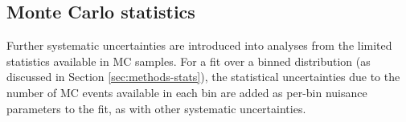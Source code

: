 \subsection{Monte Carlo statistics}
\label{sec:methods-systematics-mc}

Further systematic uncertainties are introduced into analyses from the limited
statistics available in \ac{MC} samples. For a fit over a binned distribution
(as discussed in Section \ref{sec:methods-stats}), the statistical uncertainties
due to the number of \ac{MC} events available in each bin are added as per-bin
nuisance parameters to the fit, as with other systematic uncertainties.
